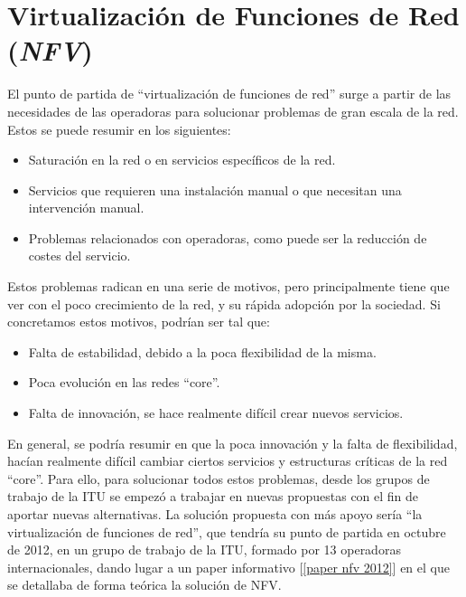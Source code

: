 \documentclass[12pt]{article}
\begin{document}
	
	\pagebreak
	
	\section{Virtualización de Funciones de Red (\textit{NFV})}
	\noindent El punto de partida de ``virtualización de funciones de red'' surge a partir de las necesidades de las operadoras para solucionar problemas de gran escala de la red. Estos se puede resumir en los siguientes:
	\begin{itemize}
		\item Saturación en la red o en servicios específicos de la red.
		\item Servicios que requieren una instalación manual o que necesitan una intervención manual.
		\item Problemas relacionados con operadoras, como puede ser la reducción de costes del servicio.
	\end{itemize}
	\noindent Estos problemas radican en una serie de motivos, pero principalmente tiene que ver con el poco crecimiento de la red, y su rápida adopción por la sociedad. Si concretamos estos motivos, podrían ser tal que:
	\begin{itemize}
		\item Falta de estabilidad, debido a la poca flexibilidad de la misma.
		\item Poca evolución en las redes ``core''.
		\item Falta de innovación, se hace realmente difícil crear nuevos servicios.
	\end{itemize}

	\noindent En general, se podría resumir en que la poca innovación y la falta de flexibilidad, hacían realmente difícil cambiar ciertos servicios y estructuras críticas de la red ``core''. Para ello, para solucionar todos estos problemas, desde los grupos de trabajo de la ITU se empezó a trabajar en nuevas propuestas con el fin de aportar nuevas alternativas. La solución propuesta con más apoyo sería ``la virtualización de funciones de red'', que tendría su punto de partida en octubre de 2012, en un grupo de trabajo de la ITU, formado por 13 operadoras internacionales, dando lugar a un paper informativo [\ref{paper nfv 2012}] en el que se detallaba de forma teórica la solución de NFV.
	
\end{document}
